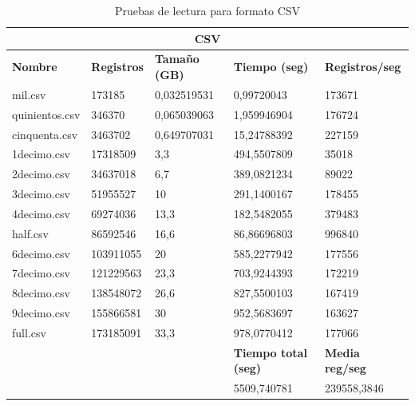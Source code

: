 \begin{table}[htp!]
	\centering
	\caption{Pruebas de lectura para formato \gls{CSV}}
	\label{velocidadCSV}
	\begin{tabular}{|l|l|l|l|l|}
		\hline
		\multicolumn{5}{|c|}{\textbf{CSV}}                                                                               \\ \hline
		\textbf{Nombre} & \textbf{Registros} & \textbf{Tamaño (GB)} & \textbf{Tiempo (seg)} & \textbf{Registros/seg} \\ \hline
		mil.csv         & 173185             & 0,032519531     & 0,99720043                 & 173671                     \\ \hline
		quinientos.csv  & 346370             & 0,065039063     & 1,959946904                & 176724                     \\ \hline
		cinquenta.csv   & 3463702            & 0,649707031     & 15,24788392                & 227159                     \\ \hline
		1decimo.csv     & 17318509           & 3,3             & 494,5507809                & 35018                      \\ \hline
		2decimo.csv     & 34637018           & 6,7             & 389,0821234                & 89022                      \\ \hline
		3decimo.csv     & 51955527           & 10              & 291,1400167                & 178455                     \\ \hline
		4decimo.csv     & 69274036           & 13,3            & 182,5482055                & 379483                     \\ \hline
		half.csv        & 86592546           & 16,6            & 86,86696803                & 996840                     \\ \hline
		6decimo.csv     & 103911055          & 20              & 585,2277942                & 177556                     \\ \hline
		7decimo.csv     & 121229563          & 23,3            & 703,9244393                & 172219                     \\ \hline
		8decimo.csv     & 138548072          & 26,6            & 827,5500103                & 167419                     \\ \hline
		9decimo.csv     & 155866581          & 30              & 952,5683697                & 163627                     \\ \hline
		full.csv        & 173185091          & 33,3            & 978,0770412                & 177066                     \\ \hline
		&                    &                      & \textbf{Tiempo total (seg)} & \textbf{Media reg/seg}     \\ \hline
		&                    &                 & 5509,740781                & 239558,3846                \\ \hline
	\end{tabular}
\end{table}

